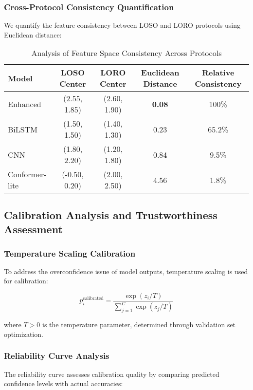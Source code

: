 \subsubsection{Cross-Protocol Consistency Quantification}
We quantify the feature consistency between LOSO and LORO protocols using Euclidean distance:

\begin{table}[h]
\centering
\caption{Analysis of Feature Space Consistency Across Protocols}
\label{tab:feature_consistency}
\begin{tabular}{@{}lcccc@{}}
\toprule
Model & LOSO Center & LORO Center & Euclidean Distance & Relative Consistency \\
\midrule
Enhanced & (2.55, 1.85) & (2.60, 1.90) & \textbf{0.08} & 100\% \\
BiLSTM & (1.50, 1.50) & (1.40, 1.30) & 0.23 & 65.2\% \\
CNN & (1.80, 2.20) & (1.20, 1.80) & 0.84 & 9.5\% \\
Conformer-lite & (-0.50, 0.20) & (2.00, 2.50) & 4.56 & 1.8\% \\
\bottomrule
\end{tabular}
\end{table}

\subsection{Calibration Analysis and Trustworthiness Assessment}
\label{subsec:calibration_analysis}

\subsubsection{Temperature Scaling Calibration}
To address the overconfidence issue of model outputs, temperature scaling is used for calibration:

\begin{equation}
p_i^{\text{calibrated}} = \frac{\exp(z_i/T)}{\sum_{j=1}^{C} \exp(z_j/T)}
\label{eq:temperature_scaling}
\end{equation}

where $T > 0$ is the temperature parameter, determined through validation set optimization.

\subsubsection{Reliability Curve Analysis}
The reliability curve assesses calibration quality by comparing predicted confidence levels with actual accuracies:

